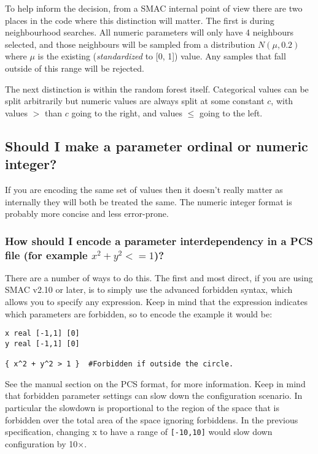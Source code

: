 \documentclass[11pt,letterpaper,oneside]{article}
\begin{document}
	
	To help inform the decision, from a SMAC internal point of view there are two places in the code where this distinction will matter. The first is during neighbourhood searches. All numeric parameters will only have 4 neighbours selected, and those neighbours will be sampled from a distribution $N(\mu, 0.2)$ where $\mu$ is the existing (\emph{standardized} to [0, 1]) value. Any samples that fall outside of this range will be rejected.
	
	The next distinction is within the random forest itself. Categorical values can be split arbitrarily but numeric values are always split at some constant $c$, with values $>$ than $c$ going to the right, and values $\leq$ going to the left.

\subsection{Should I make a parameter ordinal or numeric integer?}

	If you are encoding the same set of values then it doesn't really matter as internally they will both be treated the same. The numeric integer format is probably more concise and less error-prone.

\subsubsection{How should I encode a parameter interdependency in a PCS file (for example $x^2+y^2<=1$)?}

	There are a number of ways to do this. The first and most direct, if you are using SMAC v2.10 or later, is to simply use the advanced forbidden syntax, which allows you to specify any expression. Keep in mind that the expression indicates which parameters are forbidden, so to encode the example it would be:

\begin{verbatim}
x real [-1,1] [0]
y real [-1,1] [0]

{ x^2 + y^2 > 1 }  #Forbidden if outside the circle.
\end{verbatim}

See the manual section on the PCS format, for more information. Keep in mind that forbidden parameter settings can slow down the configuration scenario. In particular the slowdown is proportional to the region of the space that is forbidden over the total area of the space ignoring forbiddens. In the previous specification, changing x to have a range of \texttt{[-10,10]} would slow down configuration by 10$\times$.
\end{document}

